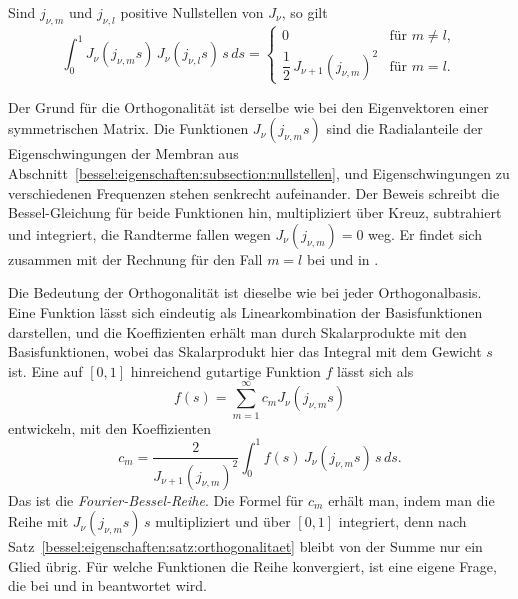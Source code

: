 \begin{satz}
\label{bessel:eigenschaften:satz:orthogonalitaet}
Sind $j_{\nu,m}$ und $j_{\nu,l}$ positive Nullstellen von $J_\nu$, so gilt
\begin{equation}
\int_0^1
J_\nu(j_{\nu,m}s)\,
J_\nu(j_{\nu,l}s)\,
s\,ds
=
\begin{cases}
0 & \text{für } m\ne l,\\[3pt]
\dfrac{1}{2}\,J_{\nu+1}(j_{\nu,m})^2 & \text{für } m=l.
\end{cases}
\label{bessel:eigenschaften:eqn:orthogonalitaet}
\end{equation}
\end{satz}

Der Grund für die Orthogonalität ist derselbe wie bei den Eigenvektoren einer symmetrischen Matrix.
Die Funktionen $J_\nu(j_{\nu,m}s)$ sind die Radialanteile der Eigenschwingungen der Membran aus Abschnitt~\ref{bessel:eigenschaften:subsection:nullstellen}, und Eigenschwingungen zu verschiedenen Frequenzen stehen senkrecht aufeinander.
Der Beweis schreibt die Bessel-Gleichung für beide Funktionen hin, multipliziert über Kreuz, subtrahiert und integriert, die Randterme fallen wegen $J_\nu(j_{\nu,m})=0$ weg.
Er findet sich zusammen mit der Rechnung für den Fall $m=l$ bei \cite[S.~132--136]{bessel:watson} und in \cite[Formel~10.22.37]{bessel:dlmf}.

Die Bedeutung der Orthogonalität ist dieselbe wie bei jeder Orthogonalbasis.
Eine Funktion lässt sich eindeutig als Linearkombination der Basisfunktionen darstellen, und die Koeffizienten erhält man durch Skalarprodukte mit den Basisfunktionen, wobei das Skalarprodukt hier das Integral mit dem Gewicht $s$ ist.
Eine auf $[0,1]$ hinreichend gutartige Funktion $f$ lässt sich als
\begin{equation}
f(s)
=
\sum_{m=1}^{\infty}
c_m J_\nu(j_{\nu,m}s)
\label{bessel:eigenschaften:eqn:fourierbessel}
\end{equation}
entwickeln, mit den Koeffizienten
\begin{equation}
c_m
=
\frac{2}{J_{\nu+1}(j_{\nu,m})^2}
\int_0^1 f(s)\,J_\nu(j_{\nu,m}s)\,s\,ds.
\label{bessel:eigenschaften:eqn:fourierkoeffizienten}
\end{equation}
Das ist die \emph{Fourier-Bessel-Reihe}.
%
Die Formel für $c_m$ erhält man, indem man die Reihe mit $J_\nu(j_{\nu,m}s)\,s$ multipliziert und über $[0,1]$ integriert, denn nach Satz~\ref{bessel:eigenschaften:satz:orthogonalitaet} bleibt von der Summe nur ein Glied übrig.
Für welche Funktionen die Reihe konvergiert, ist eine eigene Frage, die bei \cite[Kapitel~XVIII]{bessel:watson} und in \cite[Abschnitt~10.23]{bessel:dlmf} beantwortet wird.

